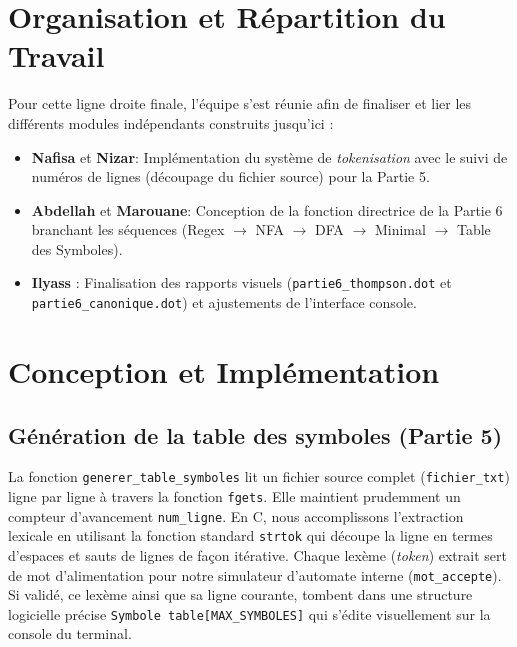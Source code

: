 \documentclass[12pt,a4paper]{article}
\begin{document}
\section{Organisation et Répartition du Travail}
Pour cette ligne droite finale, l'équipe s'est réunie afin de finaliser et lier les différents modules indépendants construits jusqu'ici :
\begin{itemize}
    \item \textbf{Nafisa} et \textbf{Nizar}: Implémentation du système de \textit{tokenisation} avec le suivi de numéros de lignes (découpage du fichier source) pour la Partie 5.
    \item \textbf{Abdellah} et \textbf{Marouane}: Conception de la fonction directrice de la Partie 6 branchant les séquences (Regex $\rightarrow$ NFA $\rightarrow$ DFA $\rightarrow$ Minimal $\rightarrow$ Table des Symboles).
    \item \textbf{Ilyass} : Finalisation des rapports visuels (\texttt{partie6\_thompson.dot} et \texttt{partie6\_canonique.dot}) et ajustements de l'interface console.
\end{itemize}

\section{Conception et Implémentation}

\subsection{Génération de la table des symboles (Partie 5)}
La fonction \texttt{generer\_table\_symboles} lit un fichier source complet (\texttt{fichier\_txt}) ligne par ligne à travers la fonction \texttt{fgets}. Elle maintient prudemment un compteur d'avancement \texttt{num\_ligne}.
En C, nous accomplissons l'extraction lexicale en utilisant la fonction standard \texttt{strtok} qui découpe la ligne en termes d'espaces et sauts de lignes de façon itérative. Chaque lexème (\textit{token}) extrait sert de mot d'alimentation pour notre simulateur d'automate interne (\texttt{mot\_accepte}).  
Si validé, ce lexème ainsi que sa ligne courante, tombent dans une structure logicielle précise \texttt{Symbole table[MAX\_SYMBOLES]} qui s'édite visuellement sur la console du terminal.
\end{document}
